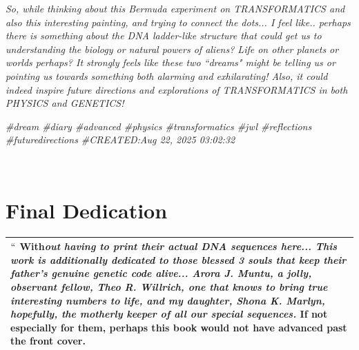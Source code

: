 \documentclass[a4paper, 18pt]{book} %
\newcommand{\comment}[1]{}
\begin{document}
\begin{appendices}
\textit{So, while thinking about this Bermuda experiment on TRANSFORMATICS and also this interesting painting, and trying to connect the dots... I feel like.. perhaps there is something about the DNA ladder-like structure that could get us to understanding the biology or natural powers of aliens? Life on other planets or worlds perhaps? It strongly feels like these two ``dreams" might be telling us or pointing us towards something both alarming and exhilarating! Also, it could indeed inspire future directions and explorations of TRANSFORMATICS in both PHYSICS and GENETICS!}


\textit{\#dream \#diary \#advanced \#physics \#transformatics \#jwl \#reflections \#futuredirections
\#CREATED:Aug 22, 2025 03:02:32}

\Large



\end{appendices}








\vspace{5cm}
\\




\chapter*{Final Dedication}


\begin{table}[H]
  \centering
  \Huge
	\begin{tabular}[t]{|p{}}
$   ``$ \textbf{With}\textit{out having to print their actual DNA sequences here...    \Large This work is additionally dedicated to those blessed 3 souls that keep their father's genuine genetic code alive...  \textbf{Arora J. Muntu}, a jolly, observant fellow, \textbf{Theo R. Willrich}, one that knows to bring true interesting numbers to life, and my daughter, \textbf{Shona K. Marlyn}, hopefully, the motherly keeper of all our special sequences.} If not especially for them, perhaps this \textbf{book would not have advanced past the front cover.}\\
	\hline
	              
\end{tabular}
  \label{TABFINDEDC}
\end{table}
\end{document}

